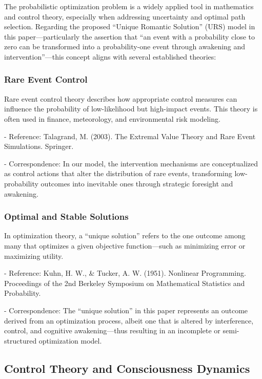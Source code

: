 \documentclass{article}
\begin{document}
The probabilistic optimization problem is a widely applied tool in mathematics and control theory, especially when addressing uncertainty and optimal path selection. Regarding the proposed “Unique Romantic Solution” (URS) model in this paper—particularly the assertion that “an event with a probability close to zero can be transformed into a probability-one event through awakening and intervention”—this concept aligns with several established theories:

\subsubsection{Rare Event Control}

Rare event control theory describes how appropriate control measures can influence the probability of low-likelihood but high-impact events. This theory is often used in finance, meteorology, and environmental risk modeling.

- Reference: Talagrand, M. (2003). The Extremal Value Theory and Rare Event Simulations. Springer.

- Correspondence: In our model, the intervention mechanisms are conceptualized as control actions that alter the distribution of rare events, transforming low-probability outcomes into inevitable ones through strategic foresight and awakening.

\subsubsection{Optimal and Stable Solutions}

In optimization theory, a “unique solution” refers to the one outcome among many that optimizes a given objective function—such as minimizing error or maximizing utility.

- Reference: Kuhn, H. W., \& Tucker, A. W. (1951). Nonlinear Programming. Proceedings of the 2nd Berkeley Symposium on Mathematical Statistics and Probability.

- Correspondence: The “unique solution” in this paper represents an outcome derived from an optimization process, albeit one that is altered by interference, control, and cognitive awakening—thus resulting in an incomplete or semi-structured optimization model.

\subsection{Control Theory and Consciousness Dynamics}
\end{document}
